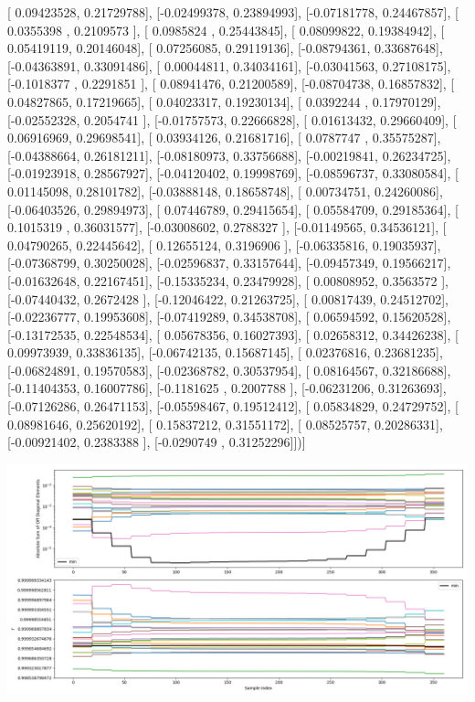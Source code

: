 \documentclass{article}
\begin{document}
       [ 0.09423528,  0.21729788],
       [-0.02499378,  0.23894993],
       [-0.07181778,  0.24467857],
       [ 0.0355398 ,  0.2109573 ],
       [ 0.0985824 ,  0.25443845],
       [ 0.08099822,  0.19384942],
       [ 0.05419119,  0.20146048],
       [ 0.07256085,  0.29119136],
       [-0.08794361,  0.33687648],
       [-0.04363891,  0.33091486],
       [ 0.00044811,  0.34034161],
       [-0.03041563,  0.27108175],
       [-0.1018377 ,  0.2291851 ],
       [ 0.08941476,  0.21200589],
       [-0.08704738,  0.16857832],
       [ 0.04827865,  0.17219665],
       [ 0.04023317,  0.19230134],
       [ 0.0392244 ,  0.17970129],
       [-0.02552328,  0.2054741 ],
       [-0.01757573,  0.22666828],
       [ 0.01613432,  0.29660409],
       [ 0.06916969,  0.29698541],
       [ 0.03934126,  0.21681716],
       [ 0.0787747 ,  0.35575287],
       [-0.04388664,  0.26181211],
       [-0.08180973,  0.33756688],
       [-0.00219841,  0.26234725],
       [-0.01923918,  0.28567927],
       [-0.04120402,  0.19998769],
       [-0.08596737,  0.33080584],
       [ 0.01145098,  0.28101782],
       [-0.03888148,  0.18658748],
       [ 0.00734751,  0.24260086],
       [-0.06403526,  0.29894973],
       [ 0.07446789,  0.29415654],
       [ 0.05584709,  0.29185364],
       [ 0.1015319 ,  0.36031577],
       [-0.03008602,  0.2788327 ],
       [-0.01149565,  0.34536121],
       [ 0.04790265,  0.22445642],
       [ 0.12655124,  0.3196906 ],
       [-0.06335816,  0.19035937],
       [-0.07368799,  0.30250028],
       [-0.02596837,  0.33157644],
       [-0.09457349,  0.19566217],
       [-0.01632648,  0.22167451],
       [-0.15335234,  0.23479928],
       [ 0.00808952,  0.3563572 ],
       [-0.07440432,  0.2672428 ],
       [-0.12046422,  0.21263725],
       [ 0.00817439,  0.24512702],
       [-0.02236777,  0.19953608],
       [-0.07419289,  0.34538708],
       [ 0.06594592,  0.15620528],
       [-0.13172535,  0.22548534],
       [ 0.05678356,  0.16027393],
       [ 0.02658312,  0.34426238],
       [ 0.09973939,  0.33836135],
       [-0.06742135,  0.15687145],
       [ 0.02376816,  0.23681235],
       [-0.06824891,  0.19570583],
       [-0.02368782,  0.30537954],
       [ 0.08164567,  0.32186688],
       [-0.11404353,  0.16007786],
       [-0.1181625 ,  0.2007788 ],
       [-0.06231206,  0.31263693],
       [-0.07126286,  0.26471153],
       [-0.05598467,  0.19512412],
       [ 0.05834829,  0.24729752],
       [ 0.08981646,  0.25620192],
       [ 0.15837212,  0.31551172],
       [ 0.08525757,  0.20286331],
       [-0.00921402,  0.2383388 ],
       [-0.0290749 ,  0.31252296]])]
\begin{center}
\includegraphics[scale=.9]{report_pickled_controls243/control_dpn_all.png}

\end{center}
\end{document}

